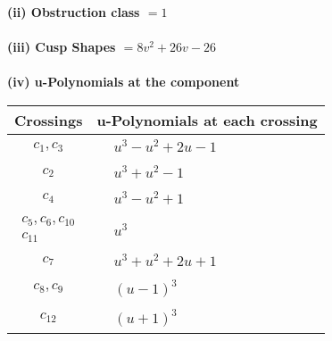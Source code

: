 \documentclass[1p]{elsarticle_modified}
\theoremstyle{definition}
\begin{document}
\flushleft \textbf{(ii) Obstruction class $= 1$}\\~\\
\flushleft \textbf{(iii) Cusp Shapes $= 8 v^2+26 v-26$}\\~\\
\newpage\renewcommand{\arraystretch}{1}
\flushleft \textbf{(iv) u-Polynomials at the component}\newline \\
\begin{tabular}{m{50pt}|m{274pt}}
Crossings & \hspace{64pt}u-Polynomials at each crossing \\
\hline $$\begin{aligned}c_{1},c_{3}\end{aligned}$$&$\begin{aligned}
&u^3- u^2+2 u-1
\end{aligned}$\\
\hline $$\begin{aligned}c_{2}\end{aligned}$$&$\begin{aligned}
&u^3+u^2-1
\end{aligned}$\\
\hline $$\begin{aligned}c_{4}\end{aligned}$$&$\begin{aligned}
&u^3- u^2+1
\end{aligned}$\\
\hline $$\begin{aligned}c_{5},c_{6},c_{10}\\c_{11}\end{aligned}$$&$\begin{aligned}
&u^3
\end{aligned}$\\
\hline $$\begin{aligned}c_{7}\end{aligned}$$&$\begin{aligned}
&u^3+u^2+2 u+1
\end{aligned}$\\
\hline $$\begin{aligned}c_{8},c_{9}\end{aligned}$$&$\begin{aligned}
&(u-1)^3
\end{aligned}$\\
\hline $$\begin{aligned}c_{12}\end{aligned}$$&$\begin{aligned}
&(u+1)^3
\end{aligned}$\\
\hline
\end{tabular}\\~\\
\end{document}
